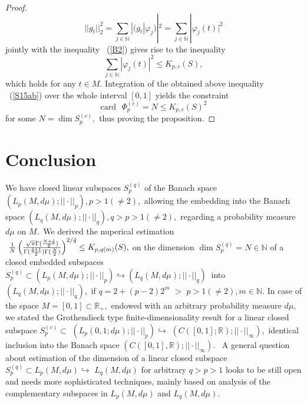 \documentclass[pdflatex,sn-mathphys-num]{sn-jnl}%
\theoremstyle{thmstyleone}%
\theoremstyle{thmstyletwo}%
\theoremstyle{thmstylethree}%
\begin{document}
\begin{proof}
	\begin{equation}
		||g_{t}||_{2}^{2}=\sum_{j\in \mathbb{N}}|(g_{t}|\varphi
		_{j})|^{2}=\sum_{j\in \mathbb{N}}|\varphi _{j}(t)|^{2}  \label{S15aa}
	\end{equation}%
	jointly with the inequality \ (\ref{B2}) gives rise to the inequality 
	\begin{equation}
		\sum_{j\in \mathbb{N}}|\varphi _{j}(t)|^{2}\leq K_{p,c}(S),  \label{S15ab}
	\end{equation}%
	which holds for any $t\in M.$ Integration of the obtained above inequality \
	(\ref{S15ab}) over the whole interval $[0,1]$ yields the constraint 
	\begin{equation}
		\mathrm{card}\text{ }\Phi _{p}^{(c)}=N\leq K_{p,c}(S)^{2}  \label{S15bb}
	\end{equation}%
	for some $N=\dim S_{p}^{(c)},$ thus proving the proposition. %
\end{proof}

\section{Conclusion}

We have closed linear subspaces $S_{p}^{(q)}$ of the 
Banach space $ (L_{p}(M,d\mu );||\cdot ||_{p}),p>1(\neq 2), $
allowing the embedding into the Banach space $(L_{q}(M,d\mu
);||\cdot ||_{q}),q>p>1(\neq 2),$ regarding a probability measure $d\mu $ on 
$M.$\ We derived the nuperical estimation \ $\ \frac{1}{N}\left( \frac{\sqrt{%
		\pi }\Gamma (\frac{N+\tilde{q}}{2})}{\Gamma (\frac{\tilde{q}+1}{2})\Gamma (%
	\frac{N}{2})}\right) ^{2/\tilde{q}}\leq K_{p,q(m)}(S),$ on the dimension $%
\dim S_{p}^{(q)}=N\in \mathbb{N}$ of a closed embedded subspaces 
$S_{p}^{(q)}\subset (L_{p}(M,d\mu );||\cdot ||_{p})\hookrightarrow
(L_{q}(M,d\mu );||\cdot ||_{q})$ $\ $into $(L_{q}(M,d\mu );||\cdot ||_{q}),$
if $q=2+(p-2)2^{m}$ $>$ $p>1(\neq 2),m\in \mathbb{N}.$  In case of the
space $M=[0,1]\subset \mathbb{R}_{+},$ endowed with an arbitrary probability
measure $d\mu ,$ we stated the Grothendieck type finite-dimensionality
result for a linear closed subspace $S_{p}^{(c)}\subset $ $\left(
L_{p}(0,1;d\mu );||\cdot ||_{p}\right) \hookrightarrow $ $\left( C([0,1];%
\mathbb{R});||\cdot ||_{\infty }\right) ,$ identical inclusion into the
Banach space $\left( C([0,1],\mathbb{R});||\cdot ||_{\infty }\right) .$ \ A
general question about estimation of the dimension of a linear closed
subspace $S_{p}^{(q)}\subset L_{p}(M,d\mu )\hookrightarrow $ $L_{q}(M,d\mu )$
for arbitrary $q>p>1$ looks to be still open and needs more sophisticated
techniques, mainly based on analysis of the complementary subspaces in $%
L_{p}(M,d\mu )$ and $L_{q}(M,d\mu ).$
\end{document}
